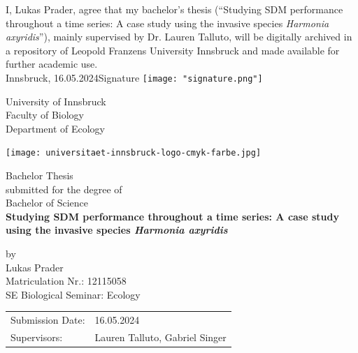 \documentclass[12pt,a4paper]{article}
\begin{document}
\def\findate{16.05.2024}


\thispagestyle{empty}
I, Lukas Prader, agree that my bachelor's thesis (``Studying SDM performance throughout a time series: A case study using the invasive species \textit{Harmonia axyridis}''), mainly supervised by Dr. Lauren Talluto, will be digitally archived in a repository of Leopold Franzens University Innsbruck and made available for further academic use. \\

Innsbruck, \findate					\hfill Signature  \texttt{[image: "signature.png"]}

\newpage
\thispagestyle{empty}
\begin{center}
    \Large{University of Innsbruck \\ Faculty of Biology} \\
    \vspace{3mm}
    \large{Department of Ecology}
    \vspace{10mm}

    \texttt{[image: universitaet-innsbruck-logo-cmyk-farbe.jpg]}

    \vspace{10mm}
    \Large{Bachelor Thesis} \\
    \large{submitted for the degree of} \\
    \Large{Bachelor of Science} \\
    \vspace{10mm}
    \LARGE{\textbf{Studying SDM performance throughout a time series: A case study using the invasive species \textit{Harmonia axyridis}}} \\
    \vspace{10mm}

    \large{by \\ Lukas Prader \\ Matriculation Nr.: 12115058 \\ SE Biological Seminar: Ecology}
\end{center}

\vspace{30mm}
\begin{tabular}{ll}
    \large{Submission Date:} & \large{\findate}                       \\
    \large{Supervisors:}     & \large{Lauren Talluto, Gabriel Singer} \\
\end{tabular}
\end{document}
